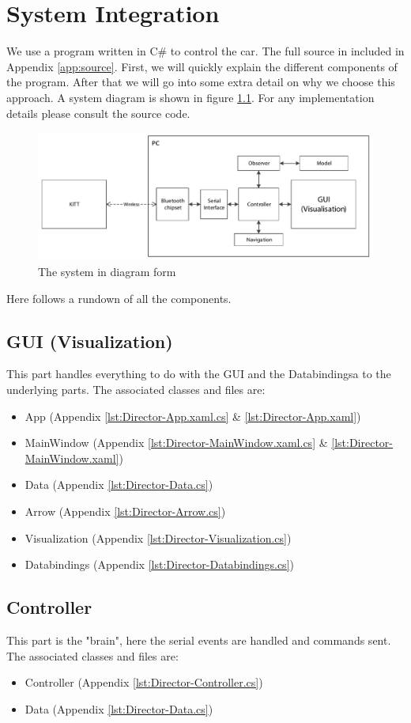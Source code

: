 \documentclass[final]{scrreprt} %
\begin{document}
\chapter{System Integration}
\label{ch:system-integration}
We use a program written in C\# to control the car.
The full source in included in Appendix \ref{app:source}.
First, we will quickly explain the different components of the program.
After that we will go into some extra detail on why we choose this approach.
A system diagram is shown in figure \ref{fig:system-diagram}.
For any implementation details please consult the source code.
\begin{figure}[H]
	\centering    	
    	\includegraphics[width=\textwidth]{resources/system-diagram.pdf}
    	\caption{The system in diagram form}
    	\label{fig:system-diagram}
\end{figure}
Here follows a rundown of all the components.
\section{GUI (Visualization)}
This part handles everything to do with the GUI and the Databindingsa to the underlying parts.
The associated classes and files are:
\begin{itemize}
\item App (Appendix \ref{lst:Director-App.xaml.cs} \& \ref{lst:Director-App.xaml})
\item MainWindow (Appendix \ref{lst:Director-MainWindow.xaml.cs} \& \ref{lst:Director-MainWindow.xaml})
\item Data (Appendix \ref{lst:Director-Data.cs})
\item Arrow (Appendix \ref{lst:Director-Arrow.cs})
\item Visualization (Appendix \ref{lst:Director-Visualization.cs})
\item Databindings (Appendix \ref{lst:Director-Databindings.cs})
\end{itemize}
\section{Controller}
This part is the "brain", here the serial events are handled and commands sent.
The associated classes and files are:
\begin{itemize}
\item Controller (Appendix \ref{lst:Director-Controller.cs})
\item Data (Appendix \ref{lst:Director-Data.cs})
\end{itemize}
\end{document}
